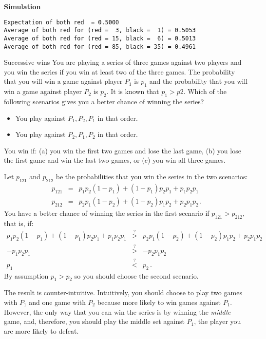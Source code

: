 \medskip
\textbf{Simulation}
\begin{verbatim}
Expectation of both red  = 0.5000
Average of both red for (red =  3, black =  1) = 0.5053
Average of both red for (red = 15, black =  6) = 0.5013
Average of both red for (red = 85, black = 35) = 0.4961
\end{verbatim}


\begin{prob}{Successive wins}
You are playing a series of three games against two players and you win the series if you win at least two of the three games. The probability that you will win a game against player $P_1$ is $p_1$ and the probability that you will win a game against player $P_2$ is $p_2$. It is known that $p_1>p2$. Which of the following scenarios gives you a better chance of winning the series?
\begin{itemize}
\item You play against $P_1,P_2,P_1$ in that order.
\item You play against $P_2,P_1,P_2$ in that order.
\end{itemize}
\end{prob}


You win if: (a) you win the first two games and lose the last game, (b) you lose the first game and win the last two games, or (c) you win all three games.

Let $p_{121}$ and $p_{212}$ be the probabilities that you win the series in the two scenarios:
\begin{eqnarray*}
p_{121}&=&p_1p_2(1-p_1) + (1-p_1)p_2p_1 + p_1p_2p_1\\
p_{212}&=&p_2p_1(1-p_2) + (1-p_2)p_1p_2 + p_2p_1p_2\,.
\end{eqnarray*}
You have a better chance of winning the series in the first scenario if $p_{121}>p_{212}$, that is, if:
\begin{eqnarray*}
p_1p_2(1-p_1) + (1-p_1)p_2p_1 + p_1p_2p_1 &\stackrel{?}{>}& 
p_2p_1(1-p_2) + (1-p_2)p_1p_2 + p_2p_1p_2\\
-p_1p_2p_1 & \stackrel{?}{>}& -p_2p_1p_2\\
p_1&\stackrel{?}{<}&p_2\,.
\end{eqnarray*}
By assumption $p_1>p_2$ so you should choose the second scenario.


The result is counter-intuitive. Intuitively, you should choose to play two games with $P_1$ and one game with $P_2$ because more likely to win games against $P_1$. However, the only way that you can win the series is by winning the \emph{middle} game, and, therefore, you should play the middle set against $P_1$, the player you are more likely to defeat.

